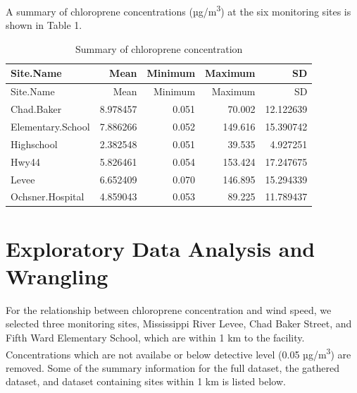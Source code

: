 \documentclass[12pt,]{article}
\newenvironment{Shaded}{\begin{snugshade}}{\end{snugshade}}
\newcommand{\KeywordTok}[1]{\textcolor[rgb]{0.13,0.29,0.53}{\textbf{#1}}}
\newcommand{\FloatTok}[1]{\textcolor[rgb]{0.00,0.00,0.81}{#1}}
\newcommand{\StringTok}[1]{\textcolor[rgb]{0.31,0.60,0.02}{#1}}
\newcommand{\CommentTok}[1]{\textcolor[rgb]{0.56,0.35,0.01}{\textit{#1}}}
\newcommand{\OperatorTok}[1]{\textcolor[rgb]{0.81,0.36,0.00}{\textbf{#1}}}
\newcommand{\NormalTok}[1]{#1}
\begin{document}
A summary of chloroprene concentrations (µg/m\textsuperscript{3}) at the
six monitoring sites is shown in Table 1.

\newpage

\begin{longtable}[]{@{}lrrrr@{}}
\caption{Summary of chloroprene concentration}\tabularnewline
\toprule
Site.Name & Mean & Minimum & Maximum & SD\tabularnewline
\midrule
\endfirsthead
\toprule
Site.Name & Mean & Minimum & Maximum & SD\tabularnewline
\midrule
\endhead
Chad.Baker & 8.978457 & 0.051 & 70.002 & 12.122639\tabularnewline
Elementary.School & 7.886266 & 0.052 & 149.616 &
15.390742\tabularnewline
Highschool & 2.382548 & 0.051 & 39.535 & 4.927251\tabularnewline
Hwy44 & 5.826461 & 0.054 & 153.424 & 17.247675\tabularnewline
Levee & 6.652409 & 0.070 & 146.895 & 15.294339\tabularnewline
Ochsner.Hospital & 4.859043 & 0.053 & 89.225 & 11.789437\tabularnewline
\bottomrule
\end{longtable}

\newpage

\section{Exploratory Data Analysis and
Wrangling}\label{exploratory-data-analysis-and-wrangling}

For the relationship between chloroprene concentration and wind speed,
we selected three monitoring sites, Mississippi River Levee, Chad Baker
Street, and Fifth Ward Elementary School, which are within 1 km to the
facility. Concentrations which are not availabe or below detective level
(0.05 µg/m\textsuperscript{3}) are removed. Some of the summary
information for the full dataset, the gathered dataset, and dataset
containing sites within 1 km is listed below.

\begin{Shaded}
\end{Shaded}
\end{document}
